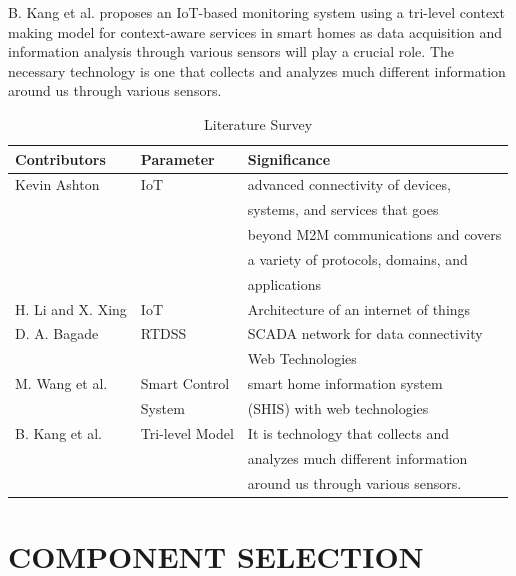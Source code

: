 \documentclass[a4paper,12pt]{report}
\begin{document}
B. Kang et al. proposes an IoT-based monitoring system using a tri-level context making model for context-aware services in smart homes
as data acquisition and information analysis through various sensors will play a crucial role. The necessary technology is one that collects 
and analyzes much different information around us through various sensors.
\cite{IoT:trilevel}
\newpage
\begin{table}[h!]
\caption{Literature Survey}
\centering
 \begin{tabular}{||l|l|l|} \hline
\bf Contributors 	& \bf Parameter & \bf Significance \\ \hline
Kevin Ashton 		& IoT		&advanced connectivity of devices,\\ 
			&		&systems, and services that goes \\
			&		&beyond M2M communications and covers\\ 
			&		& a variety of protocols, domains, and \\
			&		&applications \\ \hline
H. Li and X. Xing 	& IoT		& Architecture of an internet of things \\ \hline
D. A. Bagade		& RTDSS		& SCADA network for data connectivity\\
			&		& Web Technologies \\ \hline
M. Wang et al.		& Smart Control & smart home information system \\
			&System		&(SHIS) with web technologies \\ \hline
B. Kang et al.		& Tri-level Model& It is technology that collects and\\ 
			&		&analyzes much different information \\
			&		&around us through various sensors.\\ \hline
\end{tabular}
\end{table}












\chapter{COMPONENT SELECTION}
\label{CH:comp_selection}
\end{document}

